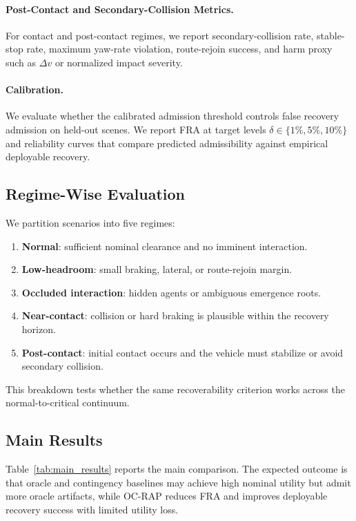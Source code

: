 \documentclass[conference]{IEEEtran}
\begin{document}
\paragraph{Post-Contact and Secondary-Collision Metrics.}
For contact and post-contact regimes, we report secondary-collision rate, stable-stop rate, maximum yaw-rate violation, route-rejoin success, and harm proxy such as $\Delta v$ or normalized impact severity.

\paragraph{Calibration.}
We evaluate whether the calibrated admission threshold controls false recovery admission on held-out scenes.  We report FRA at target levels $\delta\in\{1\%,5\%,10\%\}$ and reliability curves that compare predicted admissibility against empirical deployable recovery.

\subsection{Regime-Wise Evaluation}
\label{subsec:regime_eval}

We partition scenarios into five regimes:
\begin{enumerate}[leftmargin=*]
    \item \textbf{Normal}: sufficient nominal clearance and no imminent interaction.
    \item \textbf{Low-headroom}: small braking, lateral, or route-rejoin margin.
    \item \textbf{Occluded interaction}: hidden agents or ambiguous emergence roots.
    \item \textbf{Near-contact}: collision or hard braking is plausible within the recovery horizon.
    \item \textbf{Post-contact}: initial contact occurs and the vehicle must stabilize or avoid secondary collision.
\end{enumerate}
This breakdown tests whether the same recoverability criterion works across the normal-to-critical continuum.

\subsection{Main Results}
\label{subsec:main_results}

Table~\ref{tab:main_results} reports the main comparison.  The expected outcome is that oracle and contingency baselines may achieve high nominal utility but admit more oracle artifacts, while OC-RAP reduces FRA and improves deployable recovery success with limited utility loss.
\end{document}
